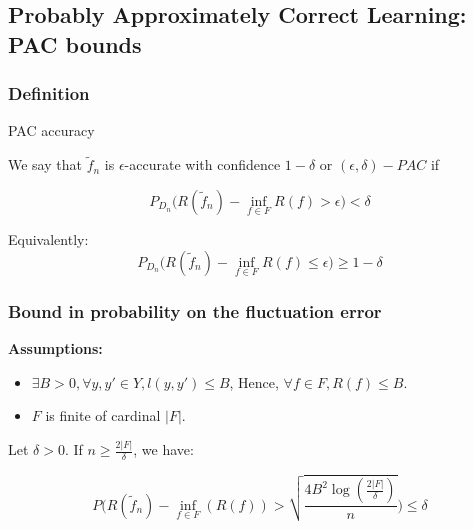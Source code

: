 \documentclass[
10pt, %
a4paper, %
oneside, %
headinclude,footinclude, %
BCOR5mm, %
]{scrartcl}
\begin{document}
\subsection{\large\color{MidnightBlue}Probably Approximately Correct Learning: PAC bounds}

\subsubsection{\large\color{Periwinkle}Definition}

\begin{definition}{PAC accuracy}

    We say that $ \tilde{f}_n$ is $\epsilon$-accurate with confidence $1-\delta$ or $(\epsilon, \delta)-PAC$ if

    \begin{equation*}
	P_{D_n}\Big(R( \tilde{f}_n)- \inf_{f\in F}R(f)> \epsilon \Big)<\delta
    \end{equation*}

    \begin{remark}
         Equivalently:
	 \begin{equation*}
	P_{D_n}\Big(R( \tilde{f}_n)- \inf_{f\in F}R(f)\leq  \epsilon \Big)\geq 1-\delta
	 \end{equation*}
    \end{remark}
\end{definition}


    \subsubsection{\large\color{Periwinkle}Bound in probability on the fluctuation error}

    \begin{theorem}

	\textbf{{Assumptions:}} 
	\begin{itemize}
	    \item $\exists B>0, \forall y,y'\in Y, l(y,y')\leq B$, Hence, $\forall f\in F, R(f)\leq B$.
	    \item $ F $ is finite of cardinal $|F|$.
	\end{itemize}

	Let $\delta>0$. If $n\geq \frac{2|F|}{\delta} $, we have:



	\begin{equation*}
	    P\Big( R( \tilde{f}_n)-\inf_{f\in F}(R(f))> \sqrt{ \frac{4B^2 \log( \frac{2|F|}{\delta} )}{n} }  \Big)\leq \delta 
	\end{equation*}
    \end{theorem}
\end{document}
